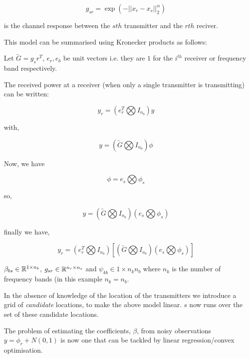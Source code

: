 \documentclass{article}
\begin{document}
\begin{equation}
g_{sr} = \exp\left(-||x_r - x_s||_2^\alpha\right)
\end{equation}

is the channel response between the \(sth\) transmitter and the \(rth\) reciver.

This model can be summarised using Kronecker products as follows:

Let \(\tilde{G} = g_sr^T\), \(e_r, e_b\) be unit vectors i.e. they are \(1\) for the \(i^{th}\) receiver or frequency band respectively.

The received power at a receiver (when only a single transmitter is transmitting) can be written:

\begin{equation}
y_r = \left(	e_r^T \bigotimes I_{n_b}\right) y
\end{equation}

with,

\begin{equation}
y = \left( \tilde{G} \bigotimes I_{n_b} \right) \phi
\end{equation}

Now, we have

\begin{equation}
\phi = e_s \bigotimes \phi_s
\end{equation}

so,

\begin{equation}
y = \left( \tilde{G} \bigotimes I_{n_b} \right) \left(e_s \bigotimes \phi_s \right)
\end{equation}

finally we have,

\begin{equation}
y_r = \left(	e_r^T \bigotimes I_{n_b}\right)\left[\left( \tilde{G} \bigotimes I_{n_b} \right) \left(e_s \bigotimes \phi_s \right)\right]
\end{equation}

\(\beta_{bs} \in {\mathbb{R}}^{1 \times n_b}\), \(g_{sr} \in {\mathbb{R}}^{n_r \times n_s}\) and \(\psi_{kb} \in 1 \times n_k n_b\) where \(n_k\) is the number of frequency bands (in this example \(n_k = n_b\).

In the absence of knowledge of the location of the transmitters we introduce a grid of \textit{candidate} locations, to make the above model linear. \(s\) now runs over the set of these candidate locations.

The problem of estimating the coefficients, \(\beta\), from noisy observations \(y = \phi_r + N\left(0,1\right)\) is now one that can be tackled by linear regression/convex optimisation.
\end{document}
